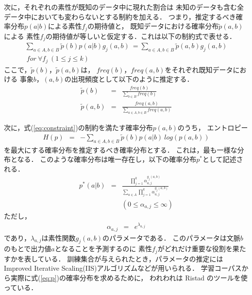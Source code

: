 次に，それぞれの素性が既知のデータ中に現れた割合は
未知のデータも含む全データ中においても変わらないとする制約を加える．
つまり，推定するべき確率分布$p(a|b)$による素性$f_j$の期待値と，
既知データにおける確率分布$\tilde{p}(a,b)$による
素性$f_j$の期待値が等しいと仮定する．これは以下の制約式で表せる．
{\small\it
\begin{eqnarray}
  \label{eq:constraint}
  \sum_{a\in A,b\in B}\tilde{p}(b)p(a|b)g_{j}(a,b) 
  \ = \sum_{a\in A,b\in B}\tilde{p}(a,b)g_{j}(a,b)\\
  \ for\ \forall f_{j}\ (1\leq j \leq k) \nonumber
\end{eqnarray}
}
ここで，$\tilde{p}(b)$，$\tilde{p}(a,b)$は，
$freq(b)$，$freq(a,b)$をそれぞれ既知データにおける
事象$b$，$(a,b)$の出現頻度として以下のように推定する．
{\small\it
\begin{eqnarray}
  \tilde{p}(b) & = & 
  \frac{freq(b)}{\displaystyle\sum_{b\in B} freq(b)}\\
  \tilde{p}(a,b) & = & 
  \frac{freq(a,b)}{\displaystyle\sum_{a\in A,b\in B} freq(a,b)}
\end{eqnarray}
}

次に，式(\ref{eq:constraint})の制約を満たす確率分布$p(a,b)$のうち，
エントロピー
{\small\it
\begin{eqnarray}
  \label{eq:entropy}
  H(p) & = & -\sum_{a\in A,b\in B}\tilde{p}(b)p(a|b)\ log\left(p(a,b)\right)
\end{eqnarray}
}
を最大にする確率分布を推定するべき確率分布とする．
これは，最も一様な分布となる．
このような確率分布は唯一存在し，以下の確率分布$p^{*}$として記述される．
{\small\it
\begin{eqnarray}
  \label{eq:p}
  p^{*}(a|b) & = & \frac{\prod_{j=1}^{k}\alpha_{a,j}^{g_{j}(a,b)}}
  {\sum_{a\in A} \prod_{j=1}^{k}\alpha_{a,j}^{g_{j}(a,b)}}\\
  & & (0\leq \alpha_{a,j}\leq \infty)\nonumber
\end{eqnarray}
}
ただし，
{\small\it
\begin{eqnarray}
  \label{eq:alpha}
  \alpha_{a,j} & = & e^{\lambda_{a,j}}
\end{eqnarray}
}
であり，$\lambda_{a,j}$は素性関数$g_{j}(a,b)$のパラメータである．
このパラメータは文脈$b$のもとで出力値$a$となることを予測するのに
素性$f_{j}$がどれだけ重要な役割を果たすかを表している．
訓練集合が与えられたとき，パラメータの推定には
Improved Iterative Scaling(IIS)アルゴリズム\cite{pietra95}などが用いられる．
学習コーパスから実際に式(\ref{eq:p})の確率分布を求めるために，
われわれは Ristad のツール\cite{ristad98}を使っている．


